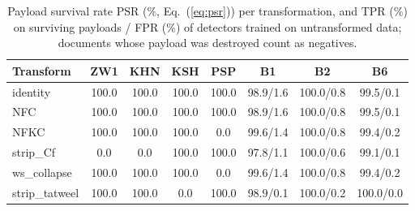 \begin{table}[!t]
\caption{Payload survival rate PSR (\%, Eq.~(\ref{eq:psr})) per transformation, and TPR (\%) on surviving payloads / FPR (\%) of detectors trained on untransformed data; documents whose payload was destroyed count as negatives.}
\label{tab:e4}
\centering\footnotesize
\setlength{\tabcolsep}{2.5pt}
\begin{tabular}{@{}lccccccc@{}}
\toprule
Transform & ZW1 & KHN & KSH & PSP & B1 & B2 & B6 \\
\midrule
identity & 100.0 & 100.0 & 100.0 & 100.0 & 98.9/1.6 & 100.0/0.8 & 99.5/0.1 \\
NFC & 100.0 & 100.0 & 100.0 & 100.0 & 98.9/1.6 & 100.0/0.8 & 99.5/0.1 \\
NFKC & 100.0 & 100.0 & 100.0 & 0.0 & 99.6/1.4 & 100.0/0.8 & 99.4/0.2 \\
strip\_Cf & 0.0 & 0.0 & 100.0 & 100.0 & 97.8/1.1 & 100.0/0.6 & 99.1/0.1 \\
ws\_collapse & 100.0 & 100.0 & 100.0 & 0.0 & 99.6/1.4 & 100.0/0.8 & 99.4/0.2 \\
strip\_tatweel & 100.0 & 100.0 & 0.0 & 100.0 & 98.9/0.1 & 100.0/0.2 & 100.0/0.0 \\
\bottomrule
\end{tabular}
\end{table}